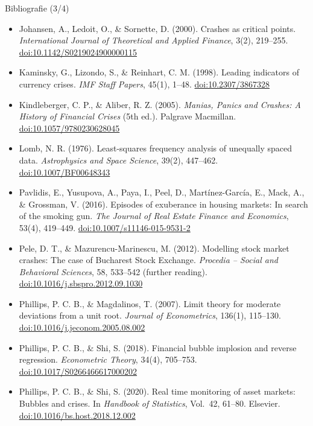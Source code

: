 \begin{frame}{Bibliografie (3/4)}
\itemsize{\tiny}
\begin{itemize}
    \item Johansen, A., Ledoit, O., \& Sornette, D. (2000). Crashes as critical points. \textit{International Journal of Theoretical and Applied Finance}, 3(2), 219--255. \href{https://doi.org/10.1142/S0219024900000115}{doi:10.1142/S0219024900000115}
    \item Kaminsky, G., Lizondo, S., \& Reinhart, C. M. (1998). Leading indicators of currency crises. \textit{IMF Staff Papers}, 45(1), 1--48. \href{https://doi.org/10.2307/3867328}{doi:10.2307/3867328}
    \item Kindleberger, C. P., \& Aliber, R. Z. (2005). \textit{Manias, Panics and Crashes: A History of Financial Crises} (5th ed.). Palgrave Macmillan. \href{https://doi.org/10.1057/9780230628045}{doi:10.1057/9780230628045}
    \item Lomb, N. R. (1976). Least-squares frequency analysis of unequally spaced data. \textit{Astrophysics and Space Science}, 39(2), 447--462. \href{https://doi.org/10.1007/BF00648343}{doi:10.1007/BF00648343}
    \item Pavlidis, E., Yusupova, A., Paya, I., Peel, D., Martínez-García, E., Mack, A., \& Grossman, V. (2016). Episodes of exuberance in housing markets: In search of the smoking gun. \textit{The Journal of Real Estate Finance and Economics}, 53(4), 419--449. \href{https://doi.org/10.1007/s11146-015-9531-2}{doi:10.1007/s11146-015-9531-2}
    \item Pele, D. T., \& Mazurencu-Marinescu, M. (2012). Modelling stock market crashes: The case of Bucharest Stock Exchange. \textit{Procedia -- Social and Behavioral Sciences}, 58, 533--542 (further reading). \href{https://doi.org/10.1016/j.sbspro.2012.09.1030}{doi:10.1016/j.sbspro.2012.09.1030}
    \item Phillips, P. C. B., \& Magdalinos, T. (2007). Limit theory for moderate deviations from a unit root. \textit{Journal of Econometrics}, 136(1), 115--130. \href{https://doi.org/10.1016/j.jeconom.2005.08.002}{doi:10.1016/j.jeconom.2005.08.002}
    \item Phillips, P. C. B., \& Shi, S. (2018). Financial bubble implosion and reverse regression. \textit{Econometric Theory}, 34(4), 705--753. \href{https://doi.org/10.1017/S0266466617000202}{doi:10.1017/S0266466617000202}
    \item Phillips, P. C. B., \& Shi, S. (2020). Real time monitoring of asset markets: Bubbles and crises. In \textit{Handbook of Statistics}, Vol.\ 42, 61--80. Elsevier. \href{https://doi.org/10.1016/bs.host.2018.12.002}{doi:10.1016/bs.host.2018.12.002}

\end{itemize}
\end{frame}
